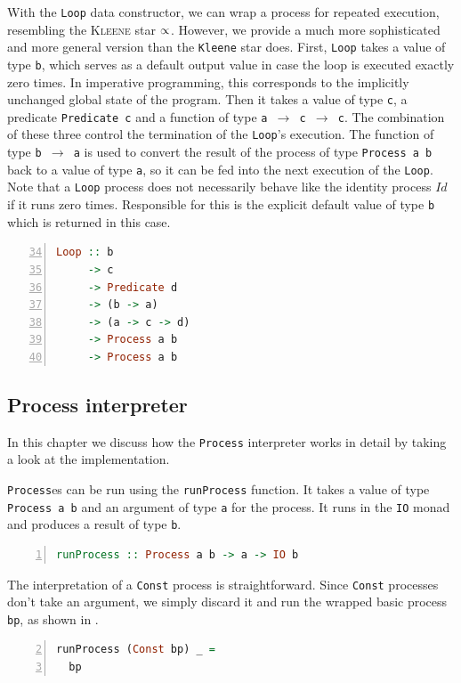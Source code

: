 With the \texttt{Loop} data constructor, we can wrap a process for repeated execution, resembling the \textsc{Kleene} star $\propto$. However, we provide a much more sophisticated and more general version than the \texttt{Kleene} star does. First, \texttt{Loop} takes a value of type \texttt{b}, which serves as a default output value in case the loop is executed exactly zero times. In imperative programming, this corresponds to the implicitly unchanged global state of the program. Then it takes a value of type \texttt{c}, a predicate \texttt{Predicate c} and a function of type \texttt{a $\to$ c $\to$ c}. The combination of these three control the termination of the \texttt{Loop}'s execution. The function of type \texttt{b $\to$ a} is used to convert the result of the process of type \texttt{Process a b} back to a value of type \texttt{a}, so it can be fed into the next execution of the \texttt{Loop}. Note that a \texttt{Loop} process does not necessarily behave like the identity process $Id$ if it runs zero times. Responsible for this is the explicit default value of type \texttt{b} which is returned in this case.
\begin{lstlisting}[language=Haskell,caption=Signature of the \texttt{Loop} data constructor.,numbers=left,frame=bt,firstnumber=34]
Loop :: b
     -> c
     -> Predicate d
     -> (b -> a)
     -> (a -> c -> d)
     -> Process a b
     -> Process a b
\end{lstlisting}


\subsection{Process interpreter}
In this chapter we discuss how the \texttt{Process} interpreter works in detail by taking a look at the implementation.

\texttt{Process}es can be run using the \texttt{runProcess} function. It takes a value of type \texttt{Process a b} and an argument of type \texttt{a} for the process. It runs in the \texttt{IO} monad and produces a result of type \texttt{b}.
\begin{lstlisting}[language=Haskell,caption=Signature of the process interpreter.,label=lst:local_runprocess_signature,numbers=left,frame=bt]
runProcess :: Process a b -> a -> IO b
\end{lstlisting}

The interpretation of a \texttt{Const} process is straightforward. Since \texttt{Const} processes don't take an argument, we simply discard it and run the wrapped basic process \texttt{bp}, as shown in .
\begin{lstlisting}[language=Haskell,caption=Implementation of the interpreter of \texttt{Const} processes.,label=lst:local_runprocess_const,numbers=left,frame=bt,firstnumber=2]
runProcess (Const bp) _ =
  bp
\end{lstlisting}

